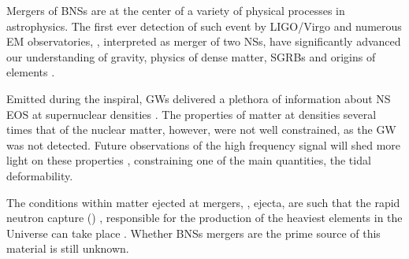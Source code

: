 %
%


Mergers of \acp{BNS} are at the center of a variety of physical processes in astrophysics.
The first ever detection of such event by \ac{LIGO}/Virgo and 
numerous \ac{EM} observatories, \GW{}, interpreted as merger of two 
\acp{NS}, have significantly advanced our understanding 
of gravity, physics of dense matter, \acp{SGRB} and origins of \rproc{} elements 
\citep{TheLIGOScientific:2017qsa,Abbott:2018wiz,GBM:2017lvd}. 

Emitted during the inspiral, \acp{GW} delivered a plethora of information about  
\ac{NS} \ac{EOS} at supernuclear densities 
\citep{Hinderer:2009ca,Damour:2012yf,DelPozzo:2013ala}. 
%
The properties of matter at densities several times that of the 
nuclear matter, however, were not well constrained, as the \pmerg{} \ac{GW} 
was not detected. Future observations of the high frequency \pmerg{} signal 
will shed more light on these properties 
\citep{Sekiguchi:2011mc,Radice:2017lry,Most:2018eaw,Bauswein:2018bma}, 
constraining one of the main quantities, the tidal deformability.

The conditions within matter ejected at mergers, \ie, ejecta, are such that the  rapid neutron capture (\rproc{}) 
\nuc{}, responsible for the production of the heaviest elements in the Universe
can take place \citep{Cowan:2019pkx}.
Whether \acp{BNS} mergers are the prime source of this material is still unknown.

